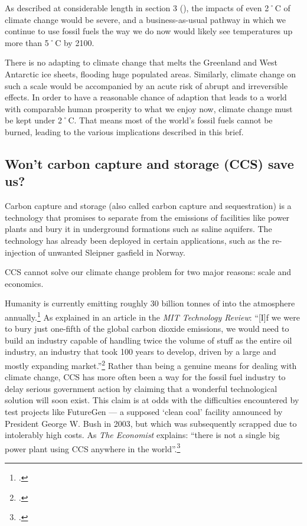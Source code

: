 As described at considerable length in section 3 (), the impacts of even 2˚C of climate change would be severe, and a business-as-usual pathway in which we continue to use fossil fuels the way we do now would likely see temperatures up more than 5˚C by 2100.


There is no adapting to climate change that melts the Greenland and West Antarctic ice sheets, flooding huge populated areas.
Similarly, climate change on such a scale would be accompanied by an acute risk of abrupt and irreversible effects.
In order to have a reasonable chance of adaption that leads to a world with comparable human prosperity to what we enjoy now, climate change must be kept under 2˚C.
That means most of the world's fossil fuels cannot be burned, leading to the various implications described in this brief.



	\subsection{Won't carbon capture and storage (CCS) save us?}
	\label{CCSSaves}



Carbon capture and storage (also called carbon capture and sequestration) is a technology that promises to separate  from the emissions of facilities like power plants and bury it in underground formations such as saline aquifers.
The technology has already been deployed in certain applications, such as the re-injection of unwanted  Sleipner gasfield in Norway.



CCS cannot solve our climate change problem for two major reasons: scale and economics.



Humanity is currently emitting roughly 30 billion tonnes of  into the atmosphere annually.\footcite[][]{RedrawingClimateEnergy}
As explained in an article in the \emph{MIT Technology Review}: ``[I]f we were to bury just one-fifth of the global carbon dioxide emissions, we would need to build an industry capable of handling twice the volume of stuff as the entire oil industry, an industry that took 100 years to develop, driven by a large and mostly expanding market.''\footcite[][]{BullisonCCS}
Rather than being a genuine means for dealing with climate change, CCS has more often been a way for the fossil fuel industry to delay serious government action by claiming that a wonderful technological solution will soon exist.
This claim is at odds with the difficulties encountered by test projects like FutureGen --- a supposed `clean coal' facility announced by President George W. Bush in 2003, but which was subsequently scrapped due to intolerably high costs.
As \emph{The Economist} explains: ``there is not a single big power plant using CCS anywhere in the world''.\footcite[][]{TroubleInStore}



